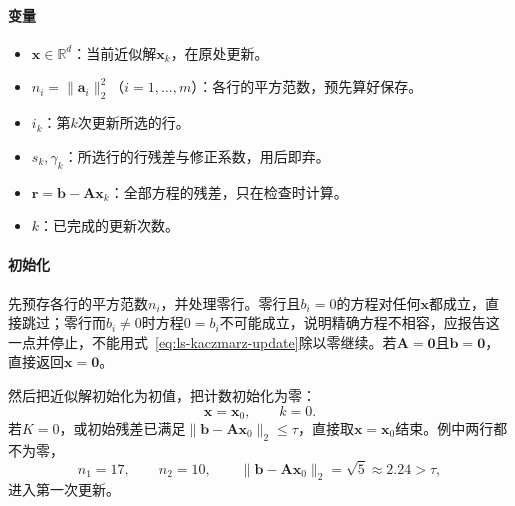 \paragraph{变量}
\begin{itemize}
 \item $\bm x\in\mathbb R^d$：当前近似解$\bm x_k$，在原处更新。
 \item $n_i=\lVert\bm a_i\rVert_2^2$（$i=1,\ldots,m$）：各行的平方范数，预先算好保存。
 \item $i_k$：第$k$次更新所选的行。
 \item $s_k,\gamma_k$：所选行的行残差与修正系数，用后即弃。
 \item $\bm r=\bm b-\bm A\bm x_k$：全部方程的残差，只在检查时计算。
 \item $k$：已完成的更新次数。
\end{itemize}

\paragraph{初始化}
先预存各行的平方范数$n_i$，并处理零行。零行且$b_i=0$的方程对任何$\bm x$都成立，直接跳过；零行而$b_i\neq0$时方程$0=b_i$不可能成立，说明精确方程不相容，应报告这一点并停止，不能用式~\eqref{eq:ls-kaczmarz-update}除以零继续。若$\bm A=\bm0$且$\bm b=\bm0$，直接返回$\bm x=\bm0$。

然后把近似解初始化为初值，把计数初始化为零：
\[
 \bm x=\bm x_0,\qquad k=0 .
\]
若$K=0$，或初始残差已满足$\lVert\bm b-\bm A\bm x_0\rVert_2\leq\tau$，直接取$\bm x=\bm x_0$结束。例中两行都不为零，
\[
 n_1=17,\qquad n_2=10,\qquad \lVert\bm b-\bm A\bm x_0\rVert_2=\sqrt5\approx2.24>\tau ,
\]
进入第一次更新。


